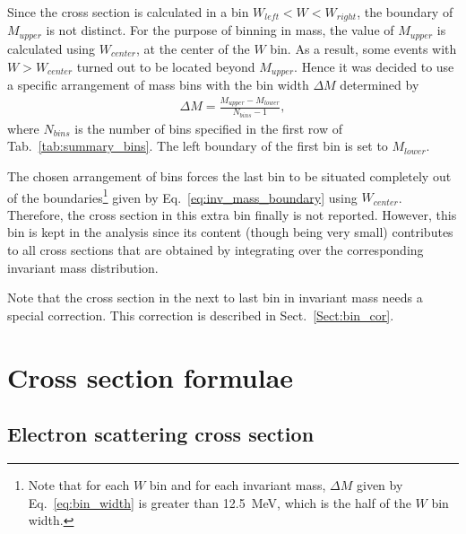 Since the cross section is calculated in a bin $W_{left} < W < W_{right}$, the boundary of $M_{upper}$ is not distinct. For the purpose of binning in mass, the value of $M_{upper}$ is calculated using $W_{center}$, at the center of the $W$ bin. As a result, some events with $W > W_{center}$ turned out to be located beyond $M_{upper}$. Hence it was decided to use a specific arrangement of mass bins with the bin width $\Delta M$ determined by
\begin{equation}
\begin{aligned}
\Delta M = \frac{M_{upper}-M_{lower}}{N_{bins}-1}, \label{eq:bin_width}
\end{aligned}  
\end{equation} 
where $N_{bins}$ is the number of bins specified in the first row of Tab.~\ref{tab:summary_bins}. The left boundary of the first bin is set to $M_{lower}$.

The chosen arrangement of bins forces the last bin to be situated completely out of the boundaries\footnote[9]{Note that for each $W$ bin and for each invariant mass, $\Delta M$ given by Eq.~\eqref{eq:bin_width} is greater than 12.5~MeV, which is the half of the $W$ bin width.} given by Eq.~\eqref{eq:inv_mass_boundary} using $W_{center}$. Therefore, the cross section in this extra bin finally is not reported. However, this bin is kept in the analysis since its content (though being very small) contributes to all cross sections that are obtained by integrating over the corresponding invariant mass distribution. 


Note that the cross section in the next to last bin in invariant mass needs a special correction. This correction is described in Sect.~\ref{Sect:bin_cor}.




\section{Cross section formulae}
\label{Sect:cr_sect_formula}

\subsection{Electron scattering cross section}

